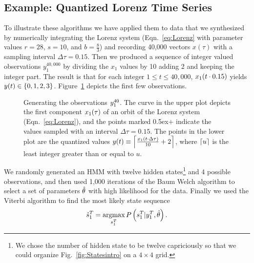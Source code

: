 \subsection{Example: Quantized Lorenz Time Series}
\label{sec:QuantizedLorenz}


To illustrate these algorithms we have applied them to data that we
synthesized by numerically integrating the Lorenz system
(Eqn.~\eqref{eq:Lorenz} with parameter values $r=28$, $s=10$, and
$b=\frac{8}{3}$) and recording 40,000 vectors $x(\tau)$ with a
sampling interval $\Delta \tau = 0.15$.  Then we produced a sequence
of integer valued observations $y_1^{40,000}$ by dividing the $x_1$
values by 10 adding 2 and keeping the integer part.  The result is
that for each integer $1\leq t \leq 40,000$, ${x_1}{(t\cdot0.15)}$
yields ${y}{(t)} \in \left\{0,1,2,3\right\}$.
Figure~\ref{fig:TSintro} depicts the first few observations.

\begin{figure}[htbp]
  \centering{\plotsize%
    }
  \caption[Generating the observations $\ts{y}{1}{40}$.]%
  {Generating the observations $\ts{y}{1}{40}$.  The curve in the
    upper plot depicts the first component ${x_1}{(\tau)}$ of an
    orbit of the Lorenz system (Eqn.~\ref{eq:Lorenz}), and the points
    marked {\scriptsize\raise0.5ex\hbox{$\bm{+}\!$}} indicate the
    values sampled with an interval $\Delta \tau = 0.15$.  The points
    in the lower plot are the quantized values ${y}{(t)} \equiv
    \left\lceil\frac{{x_1}{(t \cdot \Delta \tau)}}{10} + 2\right\rceil$, where
    $\lceil u\rceil$ is the least integer greater than or equal to $u$.  }
  \label{fig:TSintro} 
\end{figure}
 
We randomly generated an HMM with twelve hidden states\footnote{We
  chose the number of hidden state to be twelve capriciously so that
  we could organize Fig.~\ref{fig:Statesintro} on a $4\times 4$ grid.}
and 4 possible observations, and then used 1,000 iterations of the
Baum Welch algorithm to select a set of parameters $\hat {\theta}$
with high likelihood for the data.  Finally we used the Viterbi
algorithm to find the most likely state sequence
 \begin{equation*}
   {\hat s_{1}^{T}} = \operatorname*{argmax}_{s_{1}^{T}}P
   \left(s_{1}^{T}|y_{1}^{T}, \hat {\theta} \right).
 \end{equation*}
 
